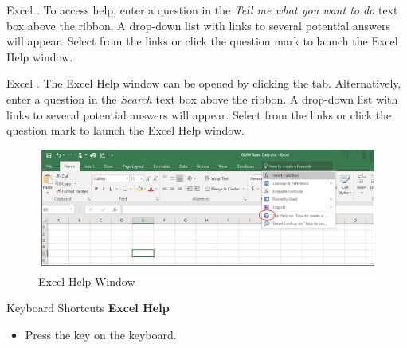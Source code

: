 Excel . To access help, enter a question in the \textit{Tell me what you want to do} text box above the ribbon. A drop-down list with links to several potential answers will appear. Select from the links or click the question mark to launch the Excel Help window.

Excel . The Excel Help window can be opened by clicking the  tab. Alternatively, enter a question in the \textit{Search} text box above the ribbon. A drop-down list with links to several potential answers will appear. Select from the links or click the question mark to launch the Excel Help window.

\begin{figure}[H]
	\centering
	\includegraphics[width=\maxwidth{.95\linewidth}]{gfx/ch01_fig14}
	\caption{Excel Help Window}
	\label{01:fig14}
\end{figure}

\begin{center}
	\begin{shtcutbox}{Keyboard Shortcuts}
		\textbf{Excel Help}
		\\
		\begin{itemize}
			\setlength{\itemsep}{0pt}
			\setlength{\parskip}{0pt}
			\setlength{\parsep}{0pt}
			
			\item Press the  key on the keyboard.
			
		\end{itemize}
	\end{shtcutbox}
\end{center}


